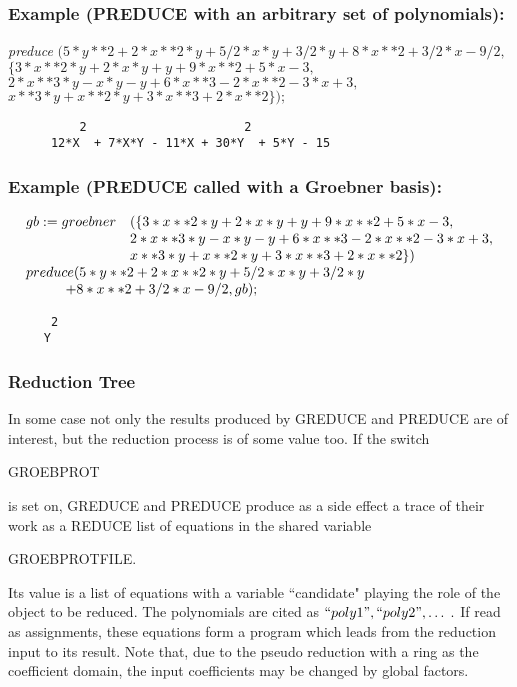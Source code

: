 \subsubsection*{Example (PREDUCE with an arbitrary set of
polynomials):}
{\it preduce} $ ( 5*y**2 + 2*x**2*y + 5/2*x*y + 3/2*y + 8*x**2 +
3/2*x - 9/2, $ \\ \hspace*{+1cm} $ \{ 3*x**2*y + 2*x*y + y + 9*x**2 +
5*x - 3, $ \\ \hspace*{+1cm} $ 2*x**3*y - x*y - y + 6*x**3 - 2*x**2 -
3*x + 3, $ \\ \hspace*{+1cm} $  x**3*y + x**2*y + 3*x**3 + 2*x**2 \});
$

\begin{verbatim}
          2                      2
      12*X  + 7*X*Y - 11*X + 30*Y  + 5*Y - 15
\end{verbatim}
\subsubsection*{Example (PREDUCE called with a Groebner basis):}
\[
\begin{array}{ll}
 gb := groebner & ( \{ 3*x**2*y + 2*x*y + y + 9*x**2 + 5*x - 3, \\
& 2*x**3*y - x*y - y + 6*x**3 - 2*x**2 - 3*x + 3, \\
& x**3*y + x**2*y + 3*x**3 + 2*x**2 \}) \\
\multicolumn{2}{l}{preduce (5*y**2 + 2*x**2*y + 5/2*x*y + 3/2*y} \\
\multicolumn{2}{l}{\hspace*{+1cm}+ 8*x**2 + 3/2*x - 9/2, gb);}
\end{array}
\]
\begin{verbatim}
      2
     Y
\end{verbatim}

\subsubsection{Reduction Tree}
In some case not only the results produced by GREDUCE and
PREDUCE are of interest, but the reduction process is of some value
too. If the switch
\begin{center}
GROEBPROT
\end{center}
is set on, GREDUCE and PREDUCE produce as a side effect a trace of
their work as a REDUCE list of equations in the shared variable
\begin{center}
GROEBPROTFILE.
\end{center}
Its value is a list of equations with a variable ``candidate" playing
the role of the object to be reduced. The polynomials are cited as
$``poly1", ``poly2", \ldots\;.$ If read as assignments, these equations
form a program which leads from the reduction input to its result.
Note that, due to the pseudo reduction with a ring as the coefficient
domain, the input coefficients may be changed by global factors.

